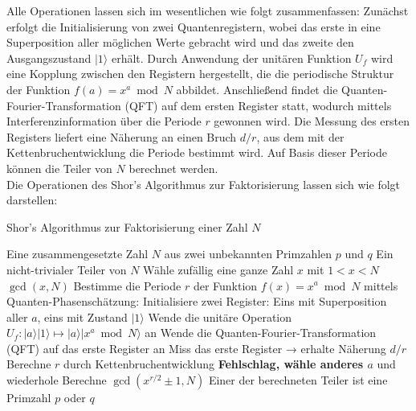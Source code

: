{\noindent
Alle Operationen lassen sich im wesentlichen wie folgt zusammenfassen: Zunächst erfolgt die Initialisierung von zwei Quantenregistern, wobei das erste in eine Superposition aller möglichen Werte gebracht wird und das zweite den Ausgangszustand \( |1\rangle \) erhält. Durch Anwendung der unitären Funktion \( U_f \) wird eine Kopplung zwischen den Registern hergestellt, die die periodische Struktur der Funktion \( f(a) = x^a \bmod N \) abbildet. Anschließend findet die Quanten-Fourier-Transformation (QFT) auf dem ersten Register statt, wodurch mittels Interferenzinformation über die Periode \( r \) gewonnen wird. Die Messung des ersten Registers liefert eine Näherung an einen Bruch \( d/r \), aus dem mit der Kettenbruchentwicklung die Periode bestimmt wird. Auf Basis dieser Periode können die Teiler von \( N \) berechnet werden. \\

\noindent Die Operationen des Shor's Algorithmus zur Faktorisierung lassen sich wie folgt darstellen:

\begin{algorithm}[H] %
\caption{Shor's Algorithmus zur Faktorisierung einer Zahl \( N \)}
\label{algorithm:shor}
\begin{algorithmic}[1]
\Require Eine zusammengesetzte Zahl \( N \) aus zwei unbekannten Primzahlen \( p \) und \( q \)
\Ensure Ein nicht-trivialer Teiler von \( N \)
\State Wähle zufällig eine ganze Zahl \( x \) mit \( 1 < x < N \)
    \State \Return \( \gcd(x, N) \) 
\EndIf
\State Bestimme die Periode \( r \) der Funktion \( f(x) = x^a \bmod N \) mittels Quanten-Phasenschätzung:
\State Initialisiere zwei Register: Eins mit Superposition aller \( a \), eins mit Zustand \( |1\rangle \)
\State Wende die unitäre Operation \( U_f \colon |a\rangle|1\rangle \mapsto |a\rangle|x^a \bmod N\rangle \) an
\State Wende die Quanten-Fourier-Transformation (QFT) auf das erste Register an
\State Miss das erste Register → erhalte Näherung \( d/r \)
\State Berechne \( r \) durch Kettenbruchentwicklung
    \State \Return \textbf{Fehlschlag, wähle anderes \( a \)} und wiederhole
\EndIf
\State Berechne \( \gcd(x^{r/2} \pm 1, N) \)
\State \Return Einer der berechneten Teiler ist eine Primzahl \( p \) oder \( q \)
\end{algorithmic}
\end{algorithm}

}
